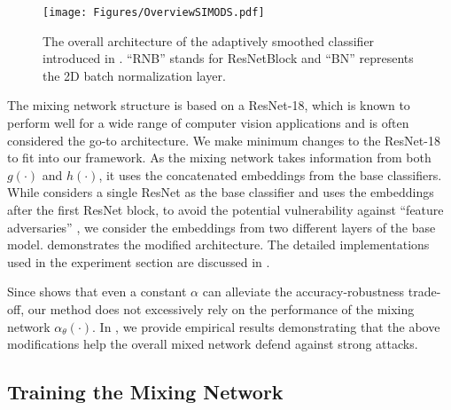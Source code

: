 \documentclass[11pt, letterpaper]{article}
\theoremstyle{plain}
\theoremstyle{definition}
\begin{document}
\begin{figure*}
    \centering
    \texttt{[image: Figures/OverviewSIMODS.pdf]}
    \caption{The overall architecture of the adaptively smoothed classifier introduced in . ``RNB'' stands for ResNetBlock and ``BN'' represents the 2D batch normalization layer.}
    \label{fig:mixing_arch}
    \vspace{-1mm}
\end{figure*}

The mixing network structure is based on a ResNet-18, which is known to perform well for a wide range of computer vision applications and is often considered the go-to architecture. We make minimum changes to the ResNet-18 to fit into our framework. As the mixing network takes information from both $g (\cdot)$ and $h (\cdot)$, it uses the concatenated embeddings from the base classifiers. While \citep{Metzen17} considers a single ResNet as the base classifier and uses the embeddings after the first ResNet block, to avoid the potential vulnerability against ``feature adversaries'' \citep{Sabour15}, we consider the embeddings from two different layers of the base model.  demonstrates the modified architecture. The detailed implementations used in the experiment section are discussed in .

Since  shows that even a constant $\alpha$ can alleviate the accuracy-robustness trade-off, our method does not excessively rely on the performance of the mixing network $\alpha_\theta (\cdot)$. In , we provide empirical results demonstrating that the above modifications help the overall mixed network defend against strong attacks.


\subsection{Training the Mixing Network} \label{sec:train_mixing_network}
\end{document}
